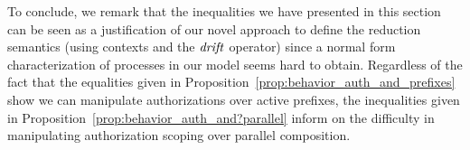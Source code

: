 
To conclude, we remark that the inequalities we have presented in this section can be seen as a justification of our novel approach to define the reduction semantics (using contexts and the $\mathit {drift}$ operator) since a normal form characterization of processes in our model seems hard to obtain. %
%
Regardless of the fact that the equalities given in Proposition~\ref{prop:behavior_auth_and_prefixes} show we can manipulate 
authorizations over active prefixes, 
the inequalities given in Proposition~\ref{prop:behavior_auth_and?parallel} inform on the difficulty 
in manipulating authorization scoping over parallel composition.

